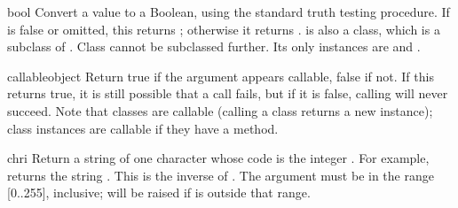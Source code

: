 \begin{funcdesc}{bool}{}
  Convert a value to a Boolean, using the standard truth testing
  procedure.  If  is false or omitted, this returns
  ; otherwise it returns .
   is also a class, which is a subclass of .
  Class  cannot be subclassed further.  Its only instances
  are  and .

\end{funcdesc}

\begin{funcdesc}{callable}{object}
  Return true if the  argument appears callable, false if
  not.  If this returns true, it is still possible that a call fails,
  but if it is false, calling  will never succeed.  Note
  that classes are callable (calling a class returns a new instance);
  class instances are callable if they have a 
  method.
\end{funcdesc}

\begin{funcdesc}{chr}{i}
  Return a string of one character whose \ASCII{} code is the integer
  .  For example,  returns the string .
  This is the inverse of .  The argument must be in
  the range [0..255], inclusive;  will be raised
  if  is outside that range.
\end{funcdesc}

